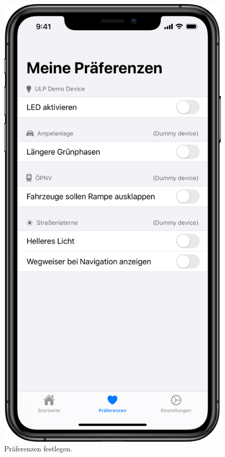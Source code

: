 \begin{minipage}{.45\textwidth}
	\begin{figure}[H]
		\centering
		\includegraphics[width=.68\textwidth]{./images/prototype/ios/prefs.png}
		\caption{\label{fig:app:ios:prefs}Präferenzen festlegen.}
	\end{figure}
\end{minipage}\hfill
